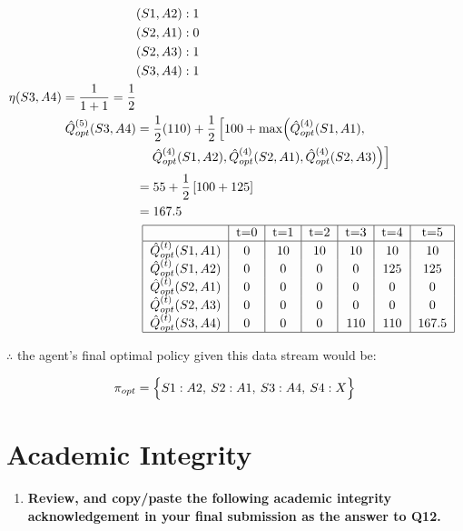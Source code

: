 \documentclass[a4paper]{article}
\begin{document}
\begin{sloppypar}
\begin{enumerate}[start=8,label=Q\arabic*,left=0pt]
\begin{align*}
        & (S1, A2): 1 \\
        & (S2, A1): 0 \\
        & (S2, A3): 1 \\
        & (S3, A4): 1 \\
        \eta(S3, A4) = \frac{1}{1 + 1} = \frac{1}{2} \\
        \hat{Q}^{(5)}_{opt}(S3, A4) &= \frac{1}{2}(110) + \frac{1}{2} \left[ 100 + \max \Bigl( \hat{Q}^{(4)}_{opt}(S1, A1), \right.\\
        & \quad \left. \hat{Q}^{(4)}_{opt}(S1, A2), \hat{Q}^{(4)}_{opt}(S2, A1), \hat{Q}^{(4)}_{opt}(S2, A3) \Bigr) \right] \\
        &= 55 + \frac{1}{2} \left[ 100 + 125 \right] \\
        &= 167.5 \\
        & \begin{array}{c}
            \begin{tabular}{|c|c|c|c|c|c|c|}
                \hline
                & t=0 & t=1 & t=2 & t=3 & t=4 & t=5 \\
                \hline
                $\hat{Q}^{(t)}_{opt}(S1, A1)$ & 0 & 10 & 10 & 10 & 10 & 10 \\ 
                $\hat{Q}^{(t)}_{opt}(S1, A2)$ & 0 & 0 & 0 & 0 & 125 & 125 \\ 
                $\hat{Q}^{(t)}_{opt}(S2, A1)$ & 0 & 0 & 0 & 0 & 0 & 0 \\ 
                $\hat{Q}^{(t)}_{opt}(S2, A3)$ & 0 & 0 & 0 & 0 & 0 & 0 \\ 
                $\hat{Q}^{(t)}_{opt}(S3, A4)$ & 0 & 0 & 0 & 110 & 110 & 167.5 \\ 
                \hline
            \end{tabular}
        \end{array}
    \end{align*}

    \noindent $\therefore$ the agent's final optimal policy given this data stream would be:

    \[ \pi_{opt} = \Bigl\{ S1: A2, \: S2: A1, \: S3: A4, \: S4: X \Bigl\} \]
    
\end{enumerate}

\section{Academic Integrity}

\begin{enumerate}[start=12,label=Q\arabic*,left=0pt]
    \item \textbf{Review, and copy/paste the following academic integrity acknowledgement in your final submission as the answer to Q12.}
    

\end{enumerate}
\end{sloppypar}
\end{document}
